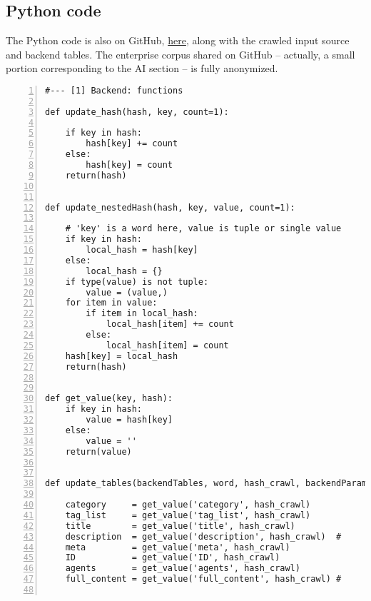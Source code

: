 \documentclass[10pt]{article}
\begin{document}
{\subsection{Python code}\label{urinac}

The Python code is also on GitHub, \href{https://github.com/VincentGranville/Large-Language-Models/blob/main/xllm6/enterprise/xllm-enterprise-v2.py}{here}, along with the crawled input source and backend tables. The enterprise corpus shared on GitHub -- actually, a small portion corresponding to the AI section -- is fully anonymized.
\vspace{1ex}


\begin{lstlisting}[numbers=left,basicstyle=\ttfamily\footnotesize]
#--- [1] Backend: functions

def update_hash(hash, key, count=1):

    if key in hash:
        hash[key] += count
    else:
        hash[key] = count
    return(hash)


def update_nestedHash(hash, key, value, count=1):

    # 'key' is a word here, value is tuple or single value
    if key in hash:
        local_hash = hash[key]
    else:
        local_hash = {}
    if type(value) is not tuple: 
        value = (value,)
    for item in value:
        if item in local_hash:
            local_hash[item] += count
        else:
            local_hash[item] = count
    hash[key] = local_hash 
    return(hash)


def get_value(key, hash):
    if key in hash:
        value = hash[key]
    else:
        value = ''
    return(value)


def update_tables(backendTables, word, hash_crawl, backendParams):

    category     = get_value('category', hash_crawl)
    tag_list     = get_value('tag_list', hash_crawl)
    title        = get_value('title', hash_crawl)
    description  = get_value('description', hash_crawl)  #
    meta         = get_value('meta', hash_crawl)
    ID           = get_value('ID', hash_crawl)
    agents       = get_value('agents', hash_crawl)
    full_content = get_value('full_content', hash_crawl) #


\end{lstlisting}}
\end{document}
